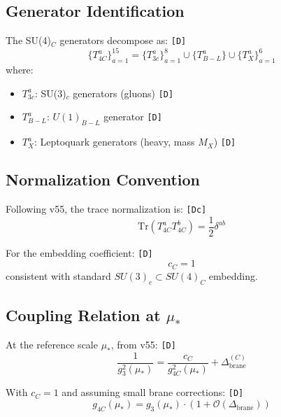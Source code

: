 \documentclass[11pt,a4paper]{article}
\newcommand{\tagD}{\textcolor{green!50!black}{\texttt{[D]}}}
\newcommand{\tagDc}{\textcolor{blue!70!black}{\texttt{[Dc]}}}
\theoremstyle{definition}
\begin{document}
\subsection{Generator Identification}
\label{subsec:generator-id}

The SU(4)$_C$ generators decompose as: \tagD{}
\begin{equation}
\label{eq:su4-decomposition}
\{T^a_{4C}\}_{a=1}^{15} = \{T^a_{3c}\}_{a=1}^{8} \cup \{T^a_{B-L}\} \cup \{T^a_X\}_{a=1}^{6}
\end{equation}
where:
\begin{itemize}
  \item $T^a_{3c}$: SU(3)$_c$ generators (gluons) \tagD{}
  \item $T^a_{B-L}$: $U(1)_{B-L}$ generator \tagD{}
  \item $T^a_X$: Leptoquark generators (heavy, mass $M_X$) \tagD{}
\end{itemize}

\subsection{Normalization Convention}
\label{subsec:normalization}

Following v55, the trace normalization is: \tagDc{}
\begin{equation}
\label{eq:trace-norm-su4}
\text{Tr}(T^a_{4C} T^b_{4C}) = \frac{1}{2} \delta^{ab}
\end{equation}

For the embedding coefficient: \tagD{}
\begin{equation}
\label{eq:embedding-coefficient}
c_C = 1
\end{equation}
consistent with standard $SU(3)_c \subset SU(4)_C$ embedding.

\subsection{Coupling Relation at $\mu_*$}
\label{subsec:coupling-relation}

At the reference scale $\mu_*$, from v55: \tagD{}
\begin{equation}
\label{eq:coupling-relation-mustar}
\frac{1}{g_3^2(\mu_*)} = \frac{c_C}{g_{4C}^2(\mu_*)} + \Delta_{\text{brane}}^{(C)}
\end{equation}

With $c_C = 1$ and assuming small brane corrections: \tagD{}
\begin{equation}
\label{eq:g4c-g3-relation}
g_{4C}(\mu_*) = g_3(\mu_*) \cdot (1 + \mathcal{O}(\Delta_{\text{brane}}))
\end{equation}
\end{document}
